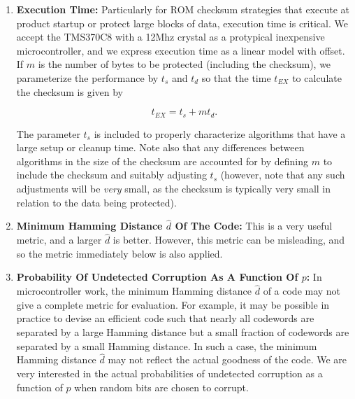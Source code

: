 \begin{enumerate}
\item \label{enum:cedc0:scon0:smgo0:01:01}
      \textbf{Execution Time:}
      Particularly for ROM checksum strategies that execute at product startup
      or protect large blocks of data, execution time is critical.  We
      accept the TMS370C8 with a 12Mhz crystal as 
      a protypical inexpensive microcontroller, and
      we express execution time as a linear model with offset.  If 
      $m$ is the number of bytes to be protected (including the 
      checksum), we parameterize the performance by $t_s$ and $t_d$ so that
      the time $t_{EX}$ to calculate the checksum is given by

      \begin{equation}
      \label{eq:cedc0:scon0:smgo0:01}
      t_{EX} = t_s + m t_d .
      \end{equation}

      The parameter $t_s$ is included to properly characterize algorithms that have
      a large setup or cleanup time.  Note also that any differences between
      algorithms in the size
      of the checksum are accounted for by defining $m$ to include the checksum and
      suitably adjusting $t_s$ (however, note that any such adjustments will be
      \emph{very} small, as the checksum is typically very small in relation to the
      data being protected).

\item \label{enum:cedc0:scon0:smgo0:01:02}
      \textbf{Minimum Hamming Distance \mbox{\boldmath$\hat{d}$} Of The Code:}
      This is a very useful metric, and a larger $\hat{d}$ is better.  However,
      this metric can be misleading, and so the metric immediately below is also
      applied.

\item \label{enum:cedc0:scon0:smgo0:01:03}
      \textbf{Probability Of Undetected Corruption As A Function Of \mbox{\boldmath$p$}:}
      In microcontroller work, the minimum Hamming distance $\hat{d}$ of a 
      code may not give a complete metric for evaluation.  For example, it
      may be possible in practice to devise an efficient code such that nearly all
      codewords are separated by a large Hamming distance but a small fraction
      of codewords are separated by a small Hamming distance.  In such a case,
      the minimum Hamming distance $\hat{d}$ may not reflect the actual goodness
      of the code.  We are very interested in the actual probabilities of undetected
      corruption as a function of $p$ when random bits are chosen to corrupt.


\end{enumerate}
